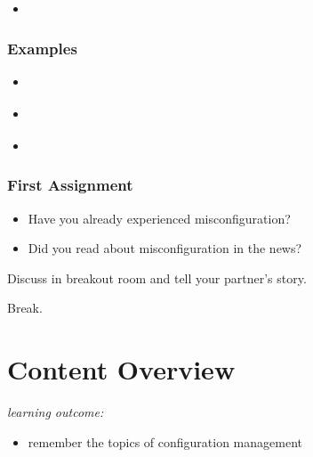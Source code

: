 {\begin{frame}
\begin{itemize}
		\item   \textcolor{white}{}
			\textcolor{white}{}
	\end{itemize}
\end{frame}
\begin{frame}
	\frametitle{Examples}
	\textcolor{white}{}
	\begin{itemize}
		\item \textcolor{white}{}
		\item \textcolor{white}{}
		\item \textcolor{white}{}
	\end{itemize}
\end{frame}
}
\begin{assignment}
	\frametitle{First Assignment}
	\begin{itemize}
		\item Have you already experienced misconfiguration?
		\item Did you read about misconfiguration in the news?
	\end{itemize}
	\begin{task}
	Discuss in breakout room and tell your partner's story.
	\end{task}
\end{assignment}

\begin{assignment}
	\begin{task}
	Break.
	\end{task}
\end{assignment}

\section{Content Overview}

\begin{frame}
	\textit{learning outcome:}
	\begin{itemize}
		\item remember the topics of configuration management
	\end{itemize}
\end{frame}


